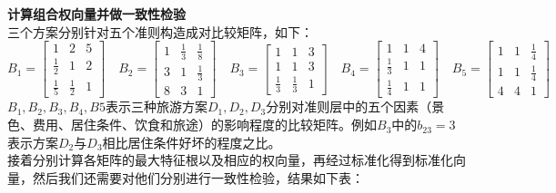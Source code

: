 \documentclass[openany]{progbookcn}
\begin{document}
\noindent \textbf{计算组合权向量并做一致性检验}\\
\indent 三个方案分别针对五个准则构造成对比较矩阵，如下：
\begin{equation}\nonumber
{B_1} = \left[ {\begin{array}{*{20}{c}}
1&2&5\\
{\frac{1}{2}}&1&2\\
{\frac{1}{5}}&{\frac{1}{2}}&1
\end{array}} \right] \quad
{B_2} = \left[ {\begin{array}{*{20}{c}}
1&{\frac{1}{3}}&{\frac{1}{8}}\\
3&1&{\frac{1}{3}}\\
8&3&1
\end{array}} \right] \quad
{B_3} = \left[ {\begin{array}{*{20}{c}}
1&1&3\\
1&1&3\\
{\frac{1}{3}}&{\frac{1}{3}}&1
\end{array}} \right] \quad
{B_4} = \left[ {\begin{array}{*{20}{c}}
1&1&4\\
{\frac{1}{3}}&1&1\\
{\frac{1}{4}}&1&1
\end{array}} \right] \quad
{B_5} = \left[ {\begin{array}{*{20}{c}}
1&1&{\frac{1}{4}}\\
1&1&{\frac{1}{4}}\\
4&4&1
\end{array}} \right]
\end{equation}
\indent $B_1,B_2,B_3,B_4,B5$表示三种旅游方案$D_1,D_2,D_3$分别对准则层中的五个因素（景色、费用、居住条件、饮食和旅途）的影响程度的比较矩阵。例如$B_3$中的$b_{23}=3$表示方案$D_2$与$D_3$相比居住条件好坏的程度之比。\\
\indent 接着分别计算各矩阵的最大特征根以及相应的权向量，再经过标准化得到标准化向量，然后我们还需要对他们分别进行一致性检验，结果如下表：
\end{document}
